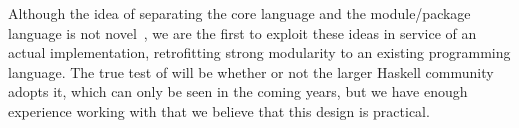 %
Although the idea of separating the core language and the module/package
language is not novel~\cite{leroy:modular,milner+:def-of-sml-revised,rossberg+:f-ing}, we are the first to exploit these ideas in service
of an actual implementation, retrofitting strong modularity to an existing
programming language.  The true test of \Backpack{} will be whether or not
the larger Haskell community adopts it, which can only be seen in the
coming years, but we have enough experience working with \Backpack{}
that we believe that this design is practical.




